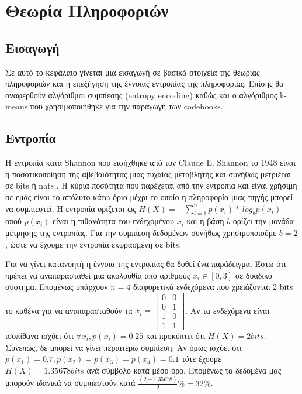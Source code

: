 ﻿\chapter{Θεωρία Πληροφοριών}
\label{chapter:chap3}

\section{Εισαγωγή}
\label{section:sect31}

\indent Σε αυτό το κεφάλαιο γίνεται μια εισαγωγή σε βασικά στοιχεία της θεωρίας πληροφοριών και η επεξήγηση της έννοιας εντροπίας της πληροφορίας. Επίσης θα αναφερθούν αλγόριθμοι συμπίεσης (entropy encoding) καθώς και ο αλγόριθμος k-means που χρησιμοποιήθηκε για την παραγωγή των codebooks.

\section{Εντροπία}
\label{section:sect32}

\indent Η εντροπία κατά Shannon που εισήχθηκε από τον Claude E. Shannon το 1948 είναι η ποσοτικοποίηση της αβεβαιότητας μιας τυχαίας μεταβλητής και συνήθως μετριέται σε bits ή nats \cite{shannon}. Η κύρια ποσότητα που παρέχεται από την εντροπία και είναι χρήσιμη σε εμάς είναι το απόλυτο κάτω όριο μέχρι το οποίο η πληροφορία μιας πηγής μπορεί να συμπιεστεί. Η εντροπία ορίζεται ως $ H(X) = -\sum_{i=1}^{n} p(x_i)*\ log_{b} p(x_i) $  οπού $p(x_i)$ είναι η πιθανότητα του ενδεχομένου $x_i$ και η βάση $b$ ορίζει την μονάδα μέτρησης της εντροπίας. Για την συμπίεση δεδομένων συνήθως χρησιμοποιούμε $b=2$, ώστε να έχουμε την εντροπία εκφρασμένη σε bits.

\indent Για να γίνει κατανοητή η έννοια της εντροπίας θα δοθεί ένα παράδειγμα. Έστω ότι πρέπει να αναπαρασταθεί μια ακολουθία από αριθμούς $x_i \in [0,3] $ σε δυαδικό σύστημα. Επομένως υπάρχουν $n=4$ διαφορετικά ενδεχόμενα που χρειάζονται 2 bits το καθένα για να αναπαρασταθούν τα
$x_i = \begin{bmatrix}
0 & 0 \\
0 & 1 \\
1 & 0 \\
1 & 1
\end{bmatrix} $. Αν τα ενδεχόμενα είναι ισοπίθανα ισχύει ότι $ \forall{x_i}, p(x_i)= 0.25 $ και προκύπτει ότι $ H(X) = 2  bits $. Συνεπώς, δε μπορεί να γίνει περαιτέρω συμπίεση. Αν όμως ισχύει ότι $ p(x_1) = 0.7, p(x_2)=p(x_3)=p(x_4)=0.1 $ τότε έχουμε $ H(X) = 1.35678  bits$ ανά σύμβολο κατά μέσο όρο. Επομένως τα δεδομένα μας μπορούν ιδανικά να συμπιεστούν κατά $\frac{(2-1.35678)}{2}\% = 32\%$.

